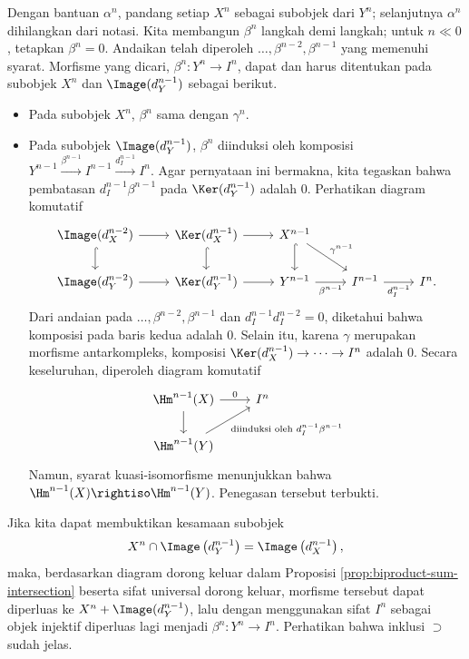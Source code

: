 \begin{bukti}
	Dengan bantuan $\alpha^n$, pandang setiap $X^n$ sebagai subobjek dari $Y^n$; selanjutnya $\alpha^n$ dihilangkan dari notasi. Kita membangun $\beta^n$ langkah demi langkah; untuk $n \ll 0$, tetapkan $\beta^n = 0$. Andaikan telah diperoleh $\ldots, \beta^{n-2}, \beta^{n-1}$ yang memenuhi syarat. Morfisme yang dicari, $\beta^n: Y^n \to I^n$, dapat dan harus ditentukan pada subobjek $X^n$ dan $\Image(d^{n-1}_Y)$ sebagai berikut.
	\begin{itemize}
		\item Pada subobjek $X^n$, $\beta^n$ sama dengan $\gamma^n$.
		\item Pada subobjek $\Image(d^{n-1}_Y)$, $\beta^n$ diinduksi oleh komposisi $Y^{n-1} \xrightarrow{\beta^{n-1}} I^{n-1} \xrightarrow{d_I^{n-1}} I^n$. Agar pernyataan ini bermakna, kita tegaskan bahwa pembatasan $d_I^{n-1} \beta^{n-1}$ pada $\Ker(d_Y^{n-1})$ adalah $0$. Perhatikan diagram komutatif
		\[\begin{tikzcd}
			\Image(d_X^{n-2}) \arrow[r] \arrow[hookrightarrow, d] & \Ker(d_X^{n-1}) \arrow[r] \arrow[hookrightarrow, d] & X^{n-1} \arrow[rd, "{\gamma^{n-1}}"] \arrow[hookrightarrow, d] & & \\
			\Image(d_Y^{n-2}) \arrow[r] & \Ker(d_Y^{n-1}) \arrow[r] & Y^{n-1} \arrow[r, "{\beta^{n-1}}"'] & I^{n-1} \arrow[r, "{d_I^{n-1}}"'] & I^n . 
		\end{tikzcd}\]
		Dari andaian pada $\ldots, \beta^{n-2}, \beta^{n-1}$ dan $d_I^{n-1} d_I^{n-2} = 0$, diketahui bahwa komposisi pada baris kedua adalah $0$. Selain itu, karena $\gamma$ merupakan morfisme antarkompleks, komposisi $\Ker(d_X^{n-1}) \to \cdots \to I^n$ adalah $0$. Secara keseluruhan, diperoleh diagram komutatif
		\[\begin{tikzcd}
			\Hm^{n-1}(X) \arrow[d] \arrow[r, "0"] & I^n \\
			\Hm^{n-1}(Y) \arrow[ru, "\text{diinduksi oleh $d_I^{n-1} \beta^{n-1}$}"'] &
		\end{tikzcd}\]
		Namun, syarat kuasi-isomorfisme menunjukkan bahwa $\Hm^{n-1}(X) \rightiso \Hm^{n-1}(Y)$. Penegasan tersebut terbukti.
	\end{itemize}
	
	Jika kita dapat membuktikan kesamaan subobjek
	\[ X^n \cap \Image\left(d_Y^{n-1} \right) = \Image\left( d_X^{n-1} \right), \]
	maka, berdasarkan diagram dorong keluar dalam Proposisi \ref{prop:biproduct-sum-intersection} beserta sifat universal dorong keluar, morfisme tersebut dapat diperluas ke $X^n + \Image(d^{n-1}_Y)$, lalu dengan menggunakan sifat $I^n$ sebagai objek injektif diperluas lagi menjadi $\beta^n: Y^n \to I^n$. Perhatikan bahwa inklusi $\supset$ sudah jelas.
	

\end{bukti}
